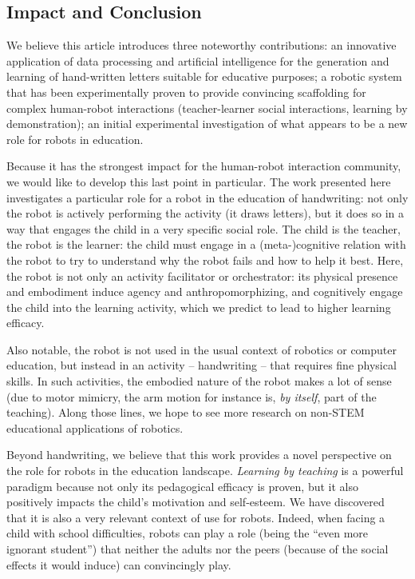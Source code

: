 \documentclass{sig-alternate}
\begin{document}
\subsection{Impact and Conclusion}

We believe this article introduces three noteworthy contributions: an innovative
application of data processing and artificial intelligence for the generation and
learning of hand-written letters suitable for educative purposes; a robotic
system that has been experimentally proven to provide convincing scaffolding for
complex human-robot interactions (teacher-learner social interactions, learning by
demonstration); an initial experimental investigation of what appears to be a
new role for robots in education.

Because it has the strongest impact for the human-robot interaction community,
we would like to develop this last point in particular. The work presented here
investigates a particular role for a robot in the education of handwriting: not
only the robot is actively performing the activity (it draws letters), but it
does so in a way that engages the child in a very specific social role. The child
is the teacher, the robot is the learner: the child must engage in a
(meta-)cognitive relation with the robot to try to understand why the
robot fails and how to help it best.  Here, the robot is not only an activity
facilitator or orchestrator: its physical presence and embodiment induce agency
and anthropomorphizing, and cognitively engage the child into the learning
activity, which we predict to lead to higher learning efficacy.

Also notable, the robot is not used in the usual context of robotics or computer
education, but instead in an activity -- handwriting -- that requires fine
physical skills. In such activities, the embodied nature of the robot makes a
lot of sense (due to motor mimicry, the arm motion for instance is, \emph{by
itself}, part of the teaching). Along those lines, we hope to see more research
on non-STEM educational applications of robotics.

Beyond handwriting, we believe that this work provides a novel perspective on
the role for robots in the education landscape. \emph{Learning by teaching} is a
powerful paradigm because not only its pedagogical efficacy is proven, but it
also positively impacts the child's motivation and self-esteem. We have
discovered that it is also a very relevant context of use for robots. Indeed,
when facing a child with school difficulties, robots can play a role (being the
``even more ignorant student'') that neither the adults nor the peers (because
of the social effects it would induce) can convincingly play.
\end{document}
